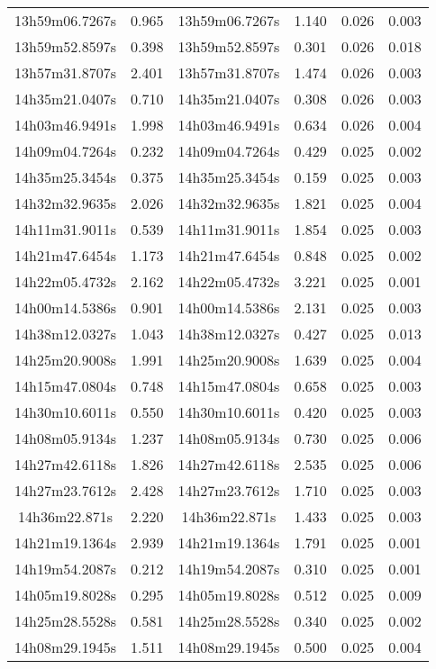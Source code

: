 \begin{table}
\begin{tabular}{cccccc}
13h59m06.7267s & 0.965 & 13h59m06.7267s & 1.140 & 0.026 & 0.003 \\
13h59m52.8597s & 0.398 & 13h59m52.8597s & 0.301 & 0.026 & 0.018 \\
13h57m31.8707s & 2.401 & 13h57m31.8707s & 1.474 & 0.026 & 0.003 \\
14h35m21.0407s & 0.710 & 14h35m21.0407s & 0.308 & 0.026 & 0.003 \\
14h03m46.9491s & 1.998 & 14h03m46.9491s & 0.634 & 0.026 & 0.004 \\
14h09m04.7264s & 0.232 & 14h09m04.7264s & 0.429 & 0.025 & 0.002 \\
14h35m25.3454s & 0.375 & 14h35m25.3454s & 0.159 & 0.025 & 0.003 \\
14h32m32.9635s & 2.026 & 14h32m32.9635s & 1.821 & 0.025 & 0.004 \\
14h11m31.9011s & 0.539 & 14h11m31.9011s & 1.854 & 0.025 & 0.003 \\
14h21m47.6454s & 1.173 & 14h21m47.6454s & 0.848 & 0.025 & 0.002 \\
14h22m05.4732s & 2.162 & 14h22m05.4732s & 3.221 & 0.025 & 0.001 \\
14h00m14.5386s & 0.901 & 14h00m14.5386s & 2.131 & 0.025 & 0.003 \\
14h38m12.0327s & 1.043 & 14h38m12.0327s & 0.427 & 0.025 & 0.013 \\
14h25m20.9008s & 1.991 & 14h25m20.9008s & 1.639 & 0.025 & 0.004 \\
14h15m47.0804s & 0.748 & 14h15m47.0804s & 0.658 & 0.025 & 0.003 \\
14h30m10.6011s & 0.550 & 14h30m10.6011s & 0.420 & 0.025 & 0.003 \\
14h08m05.9134s & 1.237 & 14h08m05.9134s & 0.730 & 0.025 & 0.006 \\
14h27m42.6118s & 1.826 & 14h27m42.6118s & 2.535 & 0.025 & 0.006 \\
14h27m23.7612s & 2.428 & 14h27m23.7612s & 1.710 & 0.025 & 0.003 \\
14h36m22.871s & 2.220 & 14h36m22.871s & 1.433 & 0.025 & 0.003 \\
14h21m19.1364s & 2.939 & 14h21m19.1364s & 1.791 & 0.025 & 0.001 \\
14h19m54.2087s & 0.212 & 14h19m54.2087s & 0.310 & 0.025 & 0.001 \\
14h05m19.8028s & 0.295 & 14h05m19.8028s & 0.512 & 0.025 & 0.009 \\
14h25m28.5528s & 0.581 & 14h25m28.5528s & 0.340 & 0.025 & 0.002 \\
14h08m29.1945s & 1.511 & 14h08m29.1945s & 0.500 & 0.025 & 0.004 \\

\end{tabular}
\end{table}
